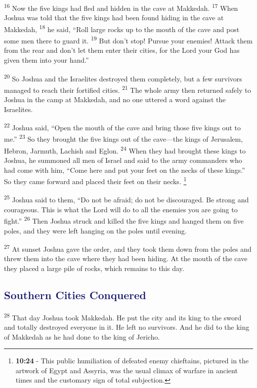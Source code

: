 \documentclass[12pt,twoside]{article}
\newcommand{\vs}[1]{\textsuperscript{#1}}
\newcommand{\vnote}[2]{%
  \begingroup
  \renewcommand\thefootnote{}%
  \footnote{\scriptsize \textbf{}#2}%
  \addtocounter{footnote}{-1}%
  \endgroup
}
\begin{document}
\hspace{0.5cm} \vs{16} Now the five kings had fled and hidden in the cave at Makkedah.
\vs{17} When Joshua was told that the five kings had been found hiding in the cave at Makkedah,
\vs{18} he said, ``Roll large rocks up to the mouth of the cave and post some men there to guard it.
\vs{19} But don't stop! Pursue your enemies! Attack them from the rear and don't let them enter their cities, for the Lord your God has given them into your hand.''

\vs{20} So Joshua and the Israelites destroyed them completely, but a few survivors managed to reach their fortified cities.
\vs{21} The whole army then returned safely to Joshua in the camp at Makkedah, and no one uttered a word against the Israelites.

\vs{22} Joshua said, ``Open the mouth of the cave and bring those five kings out to me.''
\vs{23} So they brought the five kings out of the cave---the kings of Jerusalem, Hebron, Jarmuth, Lachish and Eglon.
\vs{24} When they had brought these kings to Joshua, he summoned all men of Israel and said to the army commanders who had come with him, ``Come here and put your feet on the necks of these kings.'' So they came forward and placed their feet on their necks.\vnote{24}{\textbf{10:24} - This public humiliation of defeated enemy chieftains, pictured in the artwork of Egypt and Assyria, was the usual
climax of warfare in ancient times and the customary sign of total subjection.}

\vs{25} Joshua said to them, ``Do not be afraid; do not be discouraged. Be strong and courageous. This is what the Lord will do to all the enemies you are going to fight.''
\vs{26} Then Joshua struck and killed the five kings and hanged them on five poles, and they were left hanging on the poles until evening.

\vs{27} At sunset Joshua gave the order, and they took them down from the poles and threw them into the cave where they had been hiding. At the mouth of the cave they placed a large pile of rocks, which remains to this day.

\subsection*{{\textcolor{MidnightBlue}{\textbf{Southern Cities Conquered}}}}

\hspace{0.5cm} \vs{28} That day Joshua took Makkedah. He put the city and its king to the sword and totally destroyed everyone in it. He left no survivors. And he did to the king of Makkedah as he had done to the king of Jericho.
\end{document}
